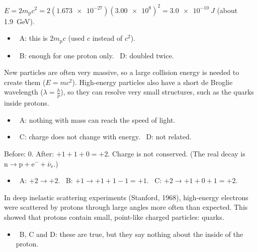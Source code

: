 \documentclass[12pt]{article}
\begin{document}
\begin{practiceanswers}
\begin{practiceans}
  $E = 2m_\mathrm{p}c^2 = 2(\num{1.673e-27})(\num{3.00e8})^2 = \qty{3.0e-10}{J}$ (about \qty{1.9}{GeV}).
  \begin{itemize}
    \item \xmark\ A: this is $2m_\mathrm{p}c$ (used $c$ instead of $c^2$).
    \item \xmark\ B: enough for one proton only. \quad \xmark\ D: doubled twice.
  \end{itemize}
\end{practiceans}

\begin{practiceans}
  New particles are often very massive, so a large collision energy is needed to create them
  ($E = mc^2$). High-energy particles also have a short de Broglie wavelength ($\lambda = \frac{h}{p}$),
  so they can resolve very small structures, such as the quarks inside protons.
  \begin{itemize}
    \item \xmark\ A: nothing with mass can reach the speed of light.
    \item \xmark\ C: charge does not change with energy. \quad \xmark\ D: not related.
  \end{itemize}
\end{practiceans}

\begin{practiceans}
  Before: $0$. After: $+1 + 1 + 0 = +2$. Charge is not conserved. (The real decay is
  $\mathrm{n} \rightarrow \mathrm{p} + \mathrm{e}^- + \bar{\nu}_\mathrm{e}$.)
  \begin{itemize}
    \item \xmark\ A: $+2 \rightarrow +2$. \quad \xmark\ B: $+1 \rightarrow +1 + 1 - 1 = +1$.
          \quad \xmark\ C: $+2 \rightarrow +1 + 0 + 1 = +2$.
  \end{itemize}
\end{practiceans}

\begin{practiceans}
  In deep inelastic scattering experiments (Stanford, 1968), high-energy electrons were scattered by
  protons through large angles more often than expected. This showed that protons contain small,
  point-like charged particles: quarks.
  \begin{itemize}
    \item \xmark\ B, C and D: these are true, but they say nothing about the inside of the proton.
  \end{itemize}
\end{practiceans}


\end{practiceanswers}
\end{document}

